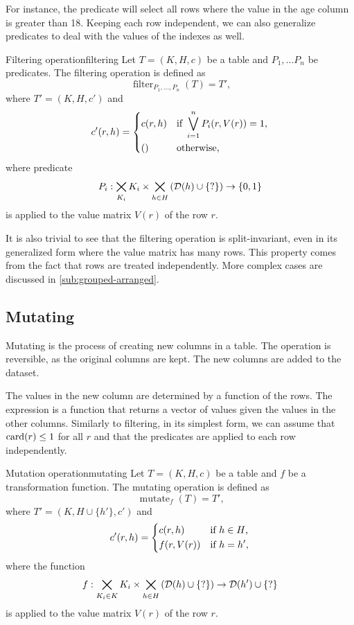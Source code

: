 For instance, the predicate  will select all rows where the value in the
age column is greater than 18.  Keeping each row independent, we can also generalize
predicates to deal with the values of the indexes as well.

\begin{defbox}{Filtering operation}{filtering}
  Let $T = (K, H, c)$ be a table and $P_1, \dots P_n$ be predicates.  The
  filtering operation is defined as \[
    \operatorname{filter}_{P_1, \dots, P_n}(T) = T'\text{,}
  \] where $T' = (K, H, c')$ and \[
    c'(r, h) = \begin{dcases}
      c(r, h) & \text{if } \bigvee_{i = 1}^{n} P_i(r, V(r)) = 1\text{,} \\
      () & \text{otherwise}\text{,}
    \end{dcases}
  \] where predicate $$P_i : \bigtimes_{K_i} K_i \times
  \bigtimes_{h\in H}\left(\domainof{h} \cup \{?\}\right) \to \{0, 1\}$$ is applied to the value
  matrix $V(r)$ of the row $r$.
\end{defbox}

It is also trivial to see that the filtering operation is split-invariant, even in its
generalized form where the value matrix has many rows.  This property comes from the fact
that rows are treated independently.  More complex cases are discussed in
\cref{sub:grouped-arranged}.

\subsection{Mutating}

Mutating is the process of creating new columns in a table.  The operation is reversible,
as the original columns are kept.  The new columns are added to the dataset.

The values in the new column are determined by a function of the rows.  The expression is
a function that returns a vector of values given the values in the other columns.
Similarly to filtering, in its simplest form, we can assume that $\rowcard[r] \leq 1$ for
all $r$ and that the predicates are applied to each row independently.

\begin{defbox}{Mutation operation}{mutating}
  Let $T = (K, H, c)$ be a table and $f$ be a transformation function.  The mutating
  operation is defined as \[
    \operatorname{mutate}_{f}(T) = T'\text{,}
  \] where $T' = (K, H \cup \{ h' \}, c')$ and \[
    c'(r, h) = \begin{dcases}
      c(r, h) & \text{if } h \in H\text{,} \\
      f(r, V(r)) & \text{if } h = h'\text{,}
    \end{dcases}
  \] where the function $$f : \bigtimes_{K_i \in K} K_i \times \bigtimes_{h\in H}
  \left(\domainof{h} \cup \{?\}\right) \to \domainof{h'} \cup \{?\}$$ is applied to the
  value matrix $V(r)$ of the row $r$.
\end{defbox}

